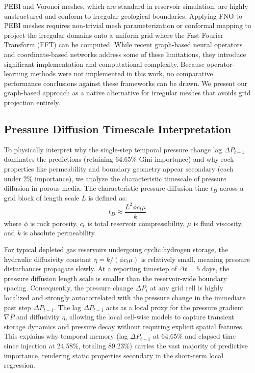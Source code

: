 PEBI and Voronoi meshes, which are standard in reservoir simulation, are highly unstructured and conform to irregular geological boundaries. Applying FNO to PEBI meshes requires non-trivial mesh parameterization or conformal mapping to project the irregular domains onto a uniform grid where the Fast Fourier Transform (FFT) can be computed. While recent graph-based neural operators and coordinate-based networks address some of these limitations, they introduce significant implementation and computational complexity. Because operator-learning methods were not implemented in this work, no comparative performance conclusions against these frameworks can be drawn. We present our graph-based approach as a native alternative for irregular meshes that avoids grid projection entirely.

\subsection{Pressure Diffusion Timescale Interpretation}
To physically interpret why the single-step temporal pressure change lag $\Delta P_{t-1}$ dominates the predictions (retaining 64.65\% Gini importance) and why rock properties like permeability and boundary geometry appear secondary (each under 2\% importance), we analyze the characteristic timescale of pressure diffusion in porous media. The characteristic pressure diffusion time $t_D$ across a grid block of length scale $L$ is defined as:
\begin{equation}
t_D \approx \frac{L^2 \phi c_t \mu}{k}
\label{eq:diffusion_time}
\end{equation}
where $\phi$ is rock porosity, $c_t$ is total reservoir compressibility, $\mu$ is fluid viscosity, and $k$ is absolute permeability. 

For typical depleted gas reservoirs undergoing cyclic hydrogen storage, the hydraulic diffusivity constant $\eta = k / (\phi c_t \mu)$ is relatively small, meaning pressure disturbances propagate slowly. At a reporting timestep of $\Delta t = 5$ days, the pressure diffusion length scale is smaller than the reservoir-wide boundary spacing. Consequently, the pressure change $\Delta P_t$ at any grid cell is highly localized and strongly autocorrelated with the pressure change in the immediate past step $\Delta P_{t-1}$. The lag $\Delta P_{t-1}$ acts as a local proxy for the pressure gradient $\nabla P$ and diffusivity $\eta$, allowing the local cell-wise models to capture transient storage dynamics and pressure decay without requiring explicit spatial features. This explains why temporal memory (lag $\Delta P_{t-1}$ at 64.65\% and elapsed time since injection at 24.58\%, totaling 89.23\%) carries the vast majority of predictive importance, rendering static properties secondary in the short-term local regression.

